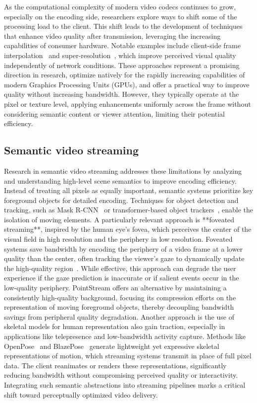 \documentclass[manuscript, screen]{acmart}
\begin{document}
As the computational complexity of modern video codecs continues to grow, especially on the encoding side, researchers explore ways to shift some of the processing load to the client. This shift leads to the development of techniques that enhance video quality after transmission, leveraging the increasing capabilities of consumer hardware. Notable examples include client-side frame interpolation~\cite{niklaus2020softmax, xu2019quadratic} and super-resolution~\cite{ledig2017photo}, which improve perceived visual quality independently of network conditions. These approaches represent a promising direction in research, optimize natively for the rapidly increasing capabilities of modern Graphics Processing Units (GPUs), and offer a practical way to improve quality without increasing bandwidth. However, they typically operate at the pixel or texture level, applying enhancements uniformly across the frame without considering semantic content or viewer attention, limiting their potential efficiency.

\subsection{Semantic video streaming}
Research in semantic video streaming addresses these limitations by analyzing and understanding high-level scene semantics to improve encoding efficiency. Instead of treating all pixels as equally important, semantic systems prioritize key foreground objects for detailed encoding. Techniques for object detection and tracking, such as Mask R-CNN~\cite{he2017mask} or transformer-based object trackers~\cite{meinhardt2022trackformer}, enable the isolation of moving elements. 
A particularly relevant approach is **foveated streaming**, inspired by the human eye's fovea, which perceives the center of the visual field in high resolution and the periphery in low resolution. Foveated systems save bandwidth by encoding the periphery of a video frame at a lower quality than the center, often tracking the viewer's gaze to dynamically update the high-quality region~\cite{foveated_streaming}. While effective, this approach can degrade the user experience if the gaze prediction is inaccurate or if salient events occur in the low-quality periphery. PointStream offers an alternative by maintaining a consistently high-quality background, focusing its compression efforts on the representation of moving foreground objects, thereby decoupling bandwidth savings from peripheral quality degradation.
Another approach is the use of skeletal models for human representation also gain traction, especially in applications like telepresence and low-bandwidth activity capture. Methods like OpenPose~\cite{cao2017realtime} and BlazePose~\cite{bazarevsky2020blazepose} generate lightweight yet expressive skeletal representations of motion, which streaming systems transmit in place of full pixel data. The client reanimates or renders these representations, significantly reducing bandwidth without compromising perceived quality or interactivity. Integrating such semantic abstractions into streaming pipelines marks a critical shift toward perceptually optimized video delivery.
\end{document}
